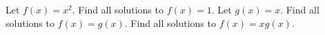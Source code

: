 \documentclass{article}
\begin{document}
    \createtitle

    \begin{problem}
	Let $f(x) = x^2$.
	\subproblem Find all solutions to $f(x) = 1$.
	\exitsubproblems
	Let $g(x) = x$.
	\subproblem Find all solutions to $f(x) = g(x)$.
	\subproblem Find all solutions to $f(x) = x g(x)$.
    \end{problem}
\end{document}
